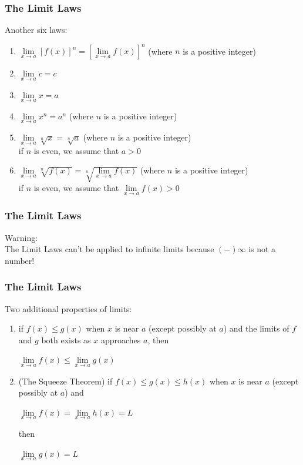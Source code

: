 \documentclass{beamer}
\begin{document}
	\begin{frame}
		\frametitle{The Limit Laws}
		Another six laws:
		\begin{enumerate}
			\item $\lim\limits_{\textit{x} \to a}[f(x)]^{n} = [\lim\limits_{\textit{x} \to a}f(x)]^{n}$ (where $n$ is a positive integer)
			\item $\lim\limits_{\textit{x} \to a}c = c$
			\item $\lim\limits_{\textit{x} \to a}x = a$
			\item $\lim\limits_{\textit{x} \to a}x^{n} = a^{n}$ (where $n$ is a positive integer)
			\item $\lim\limits_{\textit{x} \to a}\sqrt[n]{x} = \sqrt[n]{a}$ (where $n$ is a positive integer)\\
				\alert{if $n$ is even, we assume that $a > 0$}
			\item $\lim\limits_{\textit{x} \to a}\sqrt[n]{f(x)} = \sqrt[n]{\lim\limits_{\textit{x} \to a}f(x)}$ (where $n$ is a positive integer)\\
				\alert{if $n$ is even, we assume that $\lim\limits_{\textit{x} \to a}f(x) > 0$}
		\end{enumerate} 
	\end{frame}
	\begin{frame}
		\frametitle{The Limit Laws}
		\alert{Warning:}\\
		The Limit Laws can't be applied to infinite limits because $(-)\infty$ is not a number!
	\end{frame}
	\begin{frame}
		\frametitle{The Limit Laws}
		Two additional properties of limits:
		\begin{enumerate}
				\item if $f(x) \leq g(x)$ when $x$ is near $a$ (\alert{except possibly} at $a$) and the limits of $f$ and $g$ both exists as $x$ approaches $a$, then
					\begin{center}
						$\lim\limits_{\textit{x} \to a}f(x) \leq \lim\limits_{\textit{x} \to a}g(x)$
					\end{center}
				\item \alert{(The Squeeze Theorem)} if $f(x) \leq g(x) \leq h(x)$ when $x$ is near $a$ (\alert{except possibly} at $a$) and
					\begin{center}
						$\lim\limits_{\textit{x} \to a}f(x) = \lim\limits_{\textit{x} \to a}h(x) = L$
					\end{center}
					then
					\begin{center}
						$\lim\limits_{\textit{x} \to a}g(x) = L$
					\end{center}
		\end{enumerate}
	\end{frame}
\end{document}
